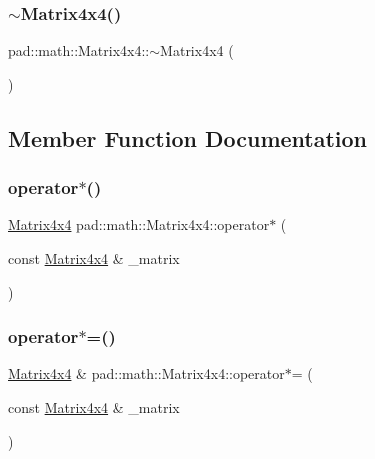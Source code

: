 \mbox{\label{structpad_1_1math_1_1_matrix4x4_a19a252dba1b3f4134b0755c8d49ed161}} 
\subsubsection{\texorpdfstring{$\sim$\+Matrix4x4()}{~Matrix4x4()}}
{\footnotesize\ttfamily pad\+::math\+::\+Matrix4x4\+::$\sim$\+Matrix4x4 (\begin{DoxyParamCaption}{ }\end{DoxyParamCaption})\hspace{0.3cm}{\ttfamily [default]}}



\subsection{Member Function Documentation}
\mbox{\label{structpad_1_1math_1_1_matrix4x4_a6f3bc37ce2fcfa89fa7b9e641969e684}} 
\subsubsection{\texorpdfstring{operator$\ast$()}{operator*()}}
{\footnotesize\ttfamily \mbox{\hyperlink{structpad_1_1math_1_1_matrix4x4}{Matrix4x4}} pad\+::math\+::\+Matrix4x4\+::operator$\ast$ (\begin{DoxyParamCaption}\item[{const \mbox{\hyperlink{structpad_1_1math_1_1_matrix4x4}{Matrix4x4}} \&}]{\+\_\+matrix }\end{DoxyParamCaption})}

\mbox{\label{structpad_1_1math_1_1_matrix4x4_a78d1c63256e91dcd87fe34f3e1f42246}} 
\subsubsection{\texorpdfstring{operator$\ast$=()}{operator*=()}}
{\footnotesize\ttfamily \mbox{\hyperlink{structpad_1_1math_1_1_matrix4x4}{Matrix4x4}} \& pad\+::math\+::\+Matrix4x4\+::operator$\ast$= (\begin{DoxyParamCaption}\item[{const \mbox{\hyperlink{structpad_1_1math_1_1_matrix4x4}{Matrix4x4}} \&}]{\+\_\+matrix }\end{DoxyParamCaption})}

